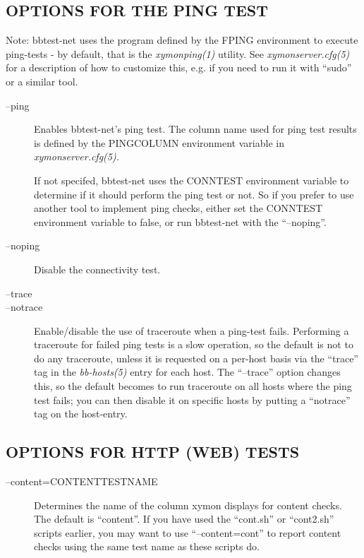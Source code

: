 \subsection{OPTIONS FOR THE PING TEST}
 Note: bbtest-net uses the program defined by the FPING environment to
 execute ping-tests - by default, that is the \emph{xymonping(1)}
 utility. See \emph{xymonserver.cfg(5)} for a description of how to
 customize this, e.g. if you need to run it with ``sudo'' or a similar
 tool. 


 \begin{description}
\item[--ping] Enables bbtest-net's ping test. The column name used for
  ping test results is defined by the PINGCOLUMN environment variable
  in \emph{xymonserver.cfg(5).}

 
 If not specifed, bbtest-net uses the CONNTEST environment variable to
 determine if it should perform the ping test or not. So if you prefer
 to use another tool to implement ping checks, either set the CONNTEST
 environment variable to false, or run bbtest-net with the
 ``--noping''. 


 

\item[--noping] Disable the connectivity test. 

 

\item[--trace]
\item[--notrace] Enable/disable the use of traceroute when a ping-test
  fails. Performing a traceroute for failed ping tests is a slow
  operation, so the default is not to do any traceroute, unless it is
  requested on a per-host basis via the ``trace'' tag in the
  \emph{bb-hosts(5) } entry for each host. The ``--trace'' option
  changes this, so the default becomes to run traceroute on all hosts
  where the ping test fails; you can then disable it on specific hosts
  by putting a ``notrace'' tag on the host-entry. 


 


\end{description}

\subsection{OPTIONS FOR HTTP (WEB) TESTS}
\begin{description}
\item[--content=CONTENTTESTNAME] Determines the name of the column
  xymon displays for content checks. The default is ``content''. If
  you have used the ``cont.sh'' or ``cont2.sh'' scripts earlier, you
  may want to use ``--content=cont'' to report content checks using
  the same test name as these scripts do. 


\end{description}


